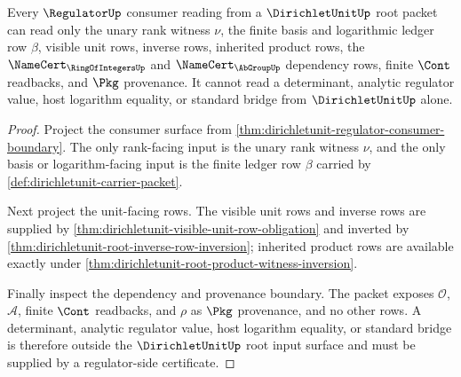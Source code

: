 \begin{theorem}
\label{thm:dirichletunit-root-regulator-input-exhaustion}
Every $\RegulatorUp$ consumer reading from a $\DirichletUnitUp$ root packet can read only the unary rank witness $\nu$, the finite basis and logarithmic ledger row $\beta$, visible unit rows, inverse rows, inherited product rows, the $\NameCert_{\RingOfIntegersUp}$ and $\NameCert_{\AbGroupUp}$ dependency rows, finite $\Cont$ readbacks, and $\Pkg$ provenance. It cannot read a determinant, analytic regulator value, host logarithm equality, or standard bridge from $\DirichletUnitUp$ alone.
\end{theorem}
\begin{proof}
Project the consumer surface from \autoref{thm:dirichletunit-regulator-consumer-boundary}. The only rank-facing input is the unary rank witness $\nu$, and the only basis or logarithm-facing input is the finite ledger row $\beta$ carried by \autoref{def:dirichletunit-carrier-packet}.

Next project the unit-facing rows. The visible unit rows and inverse rows are supplied by \autoref{thm:dirichletunit-visible-unit-row-obligation} and inverted by \autoref{thm:dirichletunit-root-inverse-row-inversion}; inherited product rows are available exactly under \autoref{thm:dirichletunit-root-product-witness-inversion}.

Finally inspect the dependency and provenance boundary. The packet exposes $\mathcal{O}$, $\mathcal{A}$, finite $\Cont$ readbacks, and $\rho$ as $\Pkg$ provenance, and no other rows. A determinant, analytic regulator value, host logarithm equality, or standard bridge is therefore outside the $\DirichletUnitUp$ root input surface and must be supplied by a regulator-side certificate.
\end{proof}

